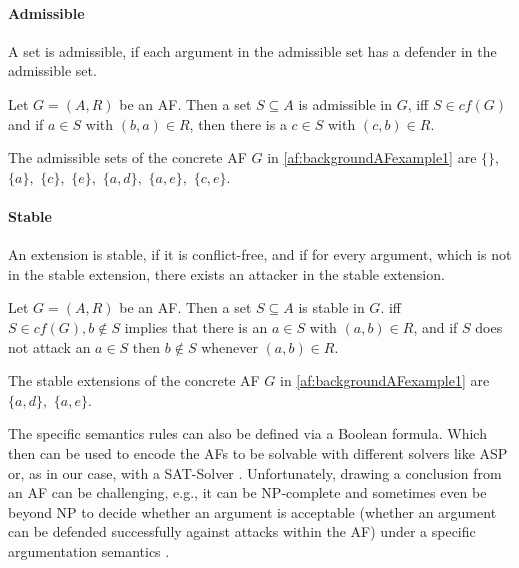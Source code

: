 \paragraph{Admissible}  A set is admissible, if each argument in the admissible set has a defender in the admissible set.


\begin{definition}
    Let $G=(A,R)$ be an AF. Then a set $S \subseteq A$ is admissible in $G$, iff $S \in cf(G)$ and if $a \in S$ with $(b, a) \in R$, then there is a $c \in S$ with $(c, b) \in R$.
\end{definition}
\begin{example}
        The admissible sets of the concrete AF $G$ in \cref{af:backgroundAFexample1} are $\{\},$
        $\{a\},$
        $\{c\},$
        $\{e\},$
        $\{a, d\},$
        $\{a, e\},$
        $\{c, e\}$.
\end{example}



\paragraph{Stable}  An extension is stable, if it is conflict-free, and if for every argument, which is not in the stable extension, there exists an attacker in the stable extension.


\begin{definition}
    Let $G=(A,R)$ be an AF. Then a set  $S \subseteq A$ is stable in $G$. iff $S \in cf(G), b \not\in S$ implies that there is an $a \in S$ with $(a, b) \in R$, and if $S$ does not attack an $a \in S$ then $b \not\in S$ whenever $(a, b) \in R$.
\end{definition}
\begin{example}
        The stable extensions of the concrete AF $G$ in \cref{af:backgroundAFexample1} are
        $\{a, d\},$
        $\{a, e\}$.
\end{example}


The specific semantics rules can also be defined via a Boolean formula. Which then can be used to encode the AFs to be solvable with different solvers like \ac{ASP} \cite{DBLP:journals/corr/abs-1301-1388} or, as in our case, with a \ac{SAT-Solver} \cite{DBLP:journals/amai/AmgoudD13}. Unfortunately, drawing a conclusion from an AF can be challenging, e.g., it can be NP-complete and sometimes even be beyond NP to decide whether an argument is acceptable (whether an argument can be defended successfully against attacks within the AF) under a specific argumentation semantics \cite{DBLP:journals/ai/DvorakGRW23}.



